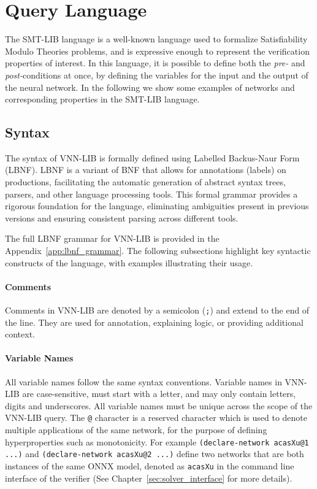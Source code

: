 \chapter{Query Language}\label{sec:specification_language}

The SMT-LIB language is a well-known language used to formalize 
Satisfiability Modulo Theories problems, and is expressive enough to
represent the verification properties of interest. In this language, 
it is possible to define both the \textit{pre-} and 
\textit{post-}conditions at once, by defining the variables for the
input and the output of the neural network. In the following we
show some examples of networks and corresponding properties in the
SMT-LIB language.

\section{Syntax}
\label{sec:syntax}

The syntax of VNN-LIB is formally defined using Labelled Backus-Naur Form (LBNF)\cite{8}. LBNF is a variant of BNF that allows for 
annotations (labels) on productions, facilitating the automatic generation of abstract syntax trees, parsers, and other language processing tools. 
This formal grammar provides a rigorous foundation for the language, eliminating ambiguities present in previous versions and ensuring consistent 
parsing across different tools.

The full LBNF grammar for VNN-LIB is provided in the Appendix~\ref{app:lbnf_grammar}. The following subsections highlight key syntactic constructs of the language,
with examples illustrating their usage.

\subsubsection*{Comments}
Comments in VNN-LIB are denoted by a semicolon (\texttt{;}) and extend to the end of the line. They are used for annotation, explaining logic, or providing additional context.

\subsubsection*{Variable Names}
All variable names follow the same syntax conventions. Variable names in VNN-LIB are case-sensitive, must start with a letter, and may only contain letters, digits and underscores. All variable names must
be unique across the scope of the VNN-LIB query. The \texttt{@} character is a reserved character which is used to denote multiple applications of the same network, for the purpose of defining 
hyperproperties such as monotonicity. For example \texttt{(declare-network acasXu@1 ...)} and \texttt{(declare-network acasXu@2 ...)} define two networks that are both instances of the same ONNX model, 
denoted as \texttt{acasXu} in the command line interface of the verifier (See Chapter~\ref{sec:solver_interface} for more details).

